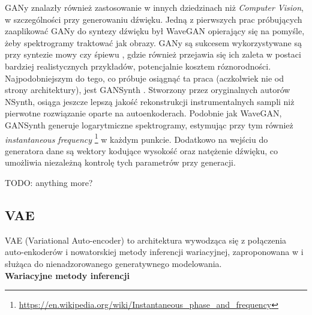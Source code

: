 \documentclass[magisterska]{pracamgr}
\renewcommand{\cite}{\citep}
\begin{document}
GANy znalazły również zastosowanie w innych dziedzinach niż \textit{Computer Vision}, w szczególności przy generowaniu dźwięku. Jedną z pierwszych prac próbujących zaaplikować GANy do syntezy dźwięku był WaveGAN \cite{donahue2019wavegan} opierający się na pomyśle, żeby spektrogramy traktować jak obrazy. GANy są sukcesem wykorzystywane są przy syntezie mowy \cite{kumar2019melgan} \cite{donahue2021endtoend} czy śpiewu \cite{sankaran2021anyonegansing}, gdzie również przejawia się ich zaleta w postaci bardziej realistycznych przykładów, potencjalnie kosztem róznorodności. Najpodobniejszym do tego, co próbuje osiągnąć ta praca (aczkolwiek nie od strony architektury), jest GANSynth \cite{engel2019gansynth}. Stworzony przez oryginalnych autorów NSynth, osiąga jeszcze lepszą jakość rekonstrukcji instrumentalnych sampli niż pierwotne rozwiązanie oparte na autoenkoderach. Podobnie jak WaveGAN, GANSynth generuje logarytmiczne spektrogramy, estymując przy tym również \textit{instantaneous frequency} \footnote{\url{https://en.wikipedia.org/wiki/Instantaneous_phase_and_frequency}} w każdym punkcie. Dodatkowo na wejściu do generatora dane są wektory kodujące wysokość oraz natężenie dźwięku, co umożliwia niezależną kontrolę tych parametrów przy generacji. 

TODO: anything more?


\subsection{VAE}

VAE (Variational Auto-encoder) to architektura wywodząca się z połączenia auto-enkoderów i nowatorskiej metody inferencji wariacyjnej, zaproponowana w \cite{kingma2014autoencoding} i służąca do nienadzorowanego generatywnego modelowania. \\

\noindent \textbf{Wariacyjne metody inferencji} \\
\end{document}
